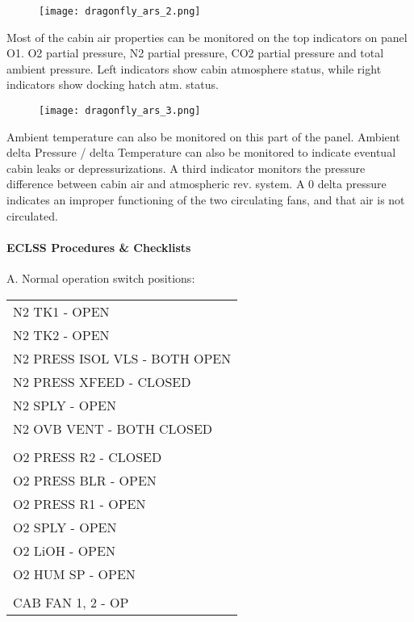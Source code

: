 \documentclass[Orbiter User Manual.tex]{subfiles}
\begin{document}
\begin{figure}[H]
  \centering
  \texttt{[image: dragonfly\_ars\_2.png]}
\end{figure}

\noindent
Most of the cabin air properties can be monitored on the top indicators on panel O1. O2 partial pressure, N2 partial pressure, CO2 partial pressure and total ambient pressure. Left indicators show cabin atmosphere status, while right indicators show docking hatch atm. status.

\begin{figure}[H]
  \centering
  \texttt{[image: dragonfly\_ars\_3.png]}
\end{figure}

\noindent
Ambient temperature can also be monitored on this part of the panel. Ambient delta Pressure / delta Temperature can also be monitored to indicate eventual cabin leaks or depressurizations. A third indicator monitors the pressure difference between cabin air and atmospheric rev. system. A 0 delta pressure indicates an improper functioning of the two circulating fans, and that air is not circulated.

\paragraph{ECLSS Procedures \& Checklists}
A. Normal operation switch positions:

	\begin{longtable}{ p{\textwidth} }
	N2 TK1 - OPEN\\
	N2 TK2 - OPEN\\
	N2 PRESS ISOL VLS - BOTH OPEN\\
	N2 PRESS XFEED - CLOSED\\
	N2 SPLY - OPEN\\
	N2 OVB VENT - BOTH CLOSED\\
	\\
	O2 PRESS R2 - CLOSED\\
	O2 PRESS BLR - OPEN\\
	O2 PRESS R1 - OPEN\\
	O2 SPLY - OPEN\\
	O2 LiOH - OPEN\\
	O2 HUM SP - OPEN\\
	\\
	CAB FAN 1, 2 - OP
	\end{longtable}
\end{document}
